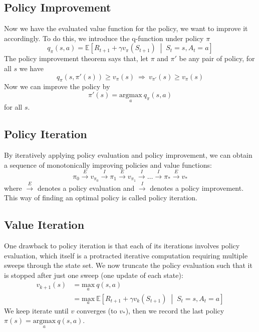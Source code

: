 \documentclass[11pt]{article}
\begin{document}
\subsection{Policy Improvement}
Now we have the evaluated value function for the policy, we want to improve it
accordingly. To do this, we introduce the q-function under policy \(\pi\)
\[q_\pi(s, a) = \mathbb{E}\left[R_{t+1} + \gamma v_\pi(S_{t+1})\;\middle|\;
S_t=s, A_t=a\right]\]
The policy improvement theorem says that, let \(\pi\) and \(\pi'\) be any pair
of policy, for all \(s\) we have
\[q_\pi(s, \pi'(s))\geq v_\pi(s) \:\Rightarrow\: v_{\pi'}(s) \geq v_\pi(s)\]
Now we can improve the policy by
\[\pi'(s)=\underset{a}{\text{argmax}}\:q_\pi(s,a)\]
for all \(s\).

\subsection{Policy Iteration}
By iteratively applying policy evaluation and policy improvement, we can obtain
a sequence of monotonically improving policies and value functions:
\[\pi_0 \overset{E}{\longrightarrow} v_{\pi_0} \overset{I}{\longrightarrow}
\pi_1 \overset{E}{\longrightarrow} v_{\pi_1} \overset{I}{\longrightarrow}
\dots \overset{I}{\longrightarrow} \pi_* \overset{E}{\longrightarrow} v_*\]
where \(\overset{E}{\longrightarrow}\) denotes a policy evaluation and
\(\overset{I}{\longrightarrow}\) denotes a policy improvement. This way of 
finding an optimal policy is called policy iteration.

\subsection{Value Iteration}
One drawback to policy iteration is that each of its iterations involves policy
evaluation, which itself is a protracted iterative computation requiring 
multiple sweeps through the state set.
\vspace{3mm}\newline We now truncate the policy evaluation such that it is
stopped after just one sweep (one update of each state):
\begin{align*}
    v_{k+1}(s)&=\underset{a}{\text{max}}\:q(s, a)\\
              &=\underset{a}{\text{max}}\:\mathbb{E}\left[
          R_{t+1}+\gamma v_k(S_{t+1})\;\middle|\;S_t=s, A_t=a\right]
\end{align*}
We keep iterate until \(v\) converges (to \(v_*\)), then we record the last
policy \(\pi(s) = \underset{a}{\text{argmax}}\:q(s, a)\).
\end{document}
